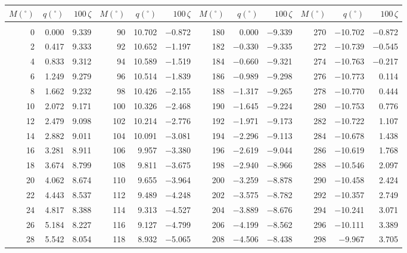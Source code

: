 \clearpage
\begin{table}[!h]\centering
\vspace{0.25cm}
\scriptsize{ \begin{tabular}{rrr|rrr|rrr|rrr}
$M(^\circ)$ & $q(^\circ)$  & $100\,\zeta$ & $M(^\circ)$ & $q(^\circ)$  & $100\,\zeta$ & $M(^\circ)$ & $q(^\circ)$  & $100\,\zeta$& $M(^\circ)$ & $q(^\circ)$  & $100\,\zeta$\\\hline
&&&&&&&&&&&\\[-1.75ex]
 0 &   0.000 &  9.339 &  90 &  10.702 & $-$0.872 & 180 &   0.000 & $-$9.339 & 270 & $-$10.702 & $-$0.872\\
  2 &   0.417 &  9.333 &  92 &  10.652 & $-$1.197 & 182 &  $-$0.330 & $-$9.335 & 272 & $-$10.739 & $-$0.545\\
  4 &   0.833 &  9.312 &  94 &  10.589 & $-$1.519 & 184 &  $-$0.660 & $-$9.321 & 274 & $-$10.763 & $-$0.217\\
  6 &   1.249 &  9.279 &  96 &  10.514 & $-$1.839 & 186 &  $-$0.989 & $-$9.298 & 276 & $-$10.773 &  0.114\\
  8 &   1.662 &  9.232 &  98 &  10.426 & $-$2.155 & 188 &  $-$1.317 & $-$9.265 & 278 & $-$10.770 &  0.444\\
 10 &   2.072 &  9.171 & 100 &  10.326 & $-$2.468 & 190 &  $-$1.645 & $-$9.224 & 280 & $-$10.753 &  0.776\\
 12 &   2.479 &  9.098 & 102 &  10.214 & $-$2.776 & 192 &  $-$1.971 & $-$9.173 & 282 & $-$10.722 &  1.107\\
 14 &   2.882 &  9.011 & 104 &  10.091 & $-$3.081 & 194 &  $-$2.296 & $-$9.113 & 284 & $-$10.678 &  1.438\\
 16 &   3.281 &  8.911 & 106 &   9.957 & $-$3.380 & 196 &  $-$2.619 & $-$9.044 & 286 & $-$10.619 &  1.768\\
 18 &   3.674 &  8.799 & 108 &   9.811 & $-$3.675 & 198 &  $-$2.940 & $-$8.966 & 288 & $-$10.546 &  2.097\\
 20 &   4.062 &  8.674 & 110 &   9.655 & $-$3.964 & 200 &  $-$3.259 & $-$8.878 & 290 & $-$10.458 &  2.424\\
 22 &   4.443 &  8.537 & 112 &   9.489 & $-$4.248 & 202 &  $-$3.575 & $-$8.782 & 292 & $-$10.357 &  2.749\\
 24 &   4.817 &  8.388 & 114 &   9.313 & $-$4.527 & 204 &  $-$3.889 & $-$8.676 & 294 & $-$10.241 &  3.071\\
 26 &   5.184 &  8.227 & 116 &   9.127 & $-$4.799 & 206 &  $-$4.199 & $-$8.562 & 296 & $-$10.111 &  3.389\\
 28 &   5.542 &  8.054 & 118 &   8.932 & $-$5.065 & 208 &  $-$4.506 & $-$8.438 & 298 &  $-$9.967 &  3.705\\

\end{tabular}}
\end{table}
